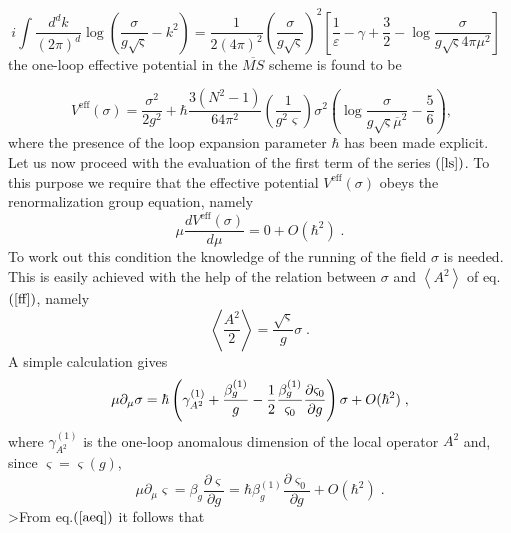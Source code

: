 \documentclass[a4paper,12pt]{article}
\begin{document}
\begin{equation}
i\int \frac{d^{d}k}{\left( 2\pi \right) ^{d}}\log \left( \frac{\sigma }{g%
\sqrt{\varsigma }}-k^{2}\right) =\frac{1}{2\left( 4\pi \right) ^{2}}\left( 
\frac{\sigma }{g\sqrt{\varsigma }}\right) ^{2}\left[ \frac{1}{\varepsilon }%
-\gamma +\frac{3}{2}-\log \frac{\sigma }{g\sqrt{\varsigma }4\pi \mu ^{2}}%
\right] \;\;  \label{dr}
\end{equation}
the one-loop effective potential in the $\overline{MS}$ scheme is found to be

\begin{equation}
\;V^{\mathrm{eff}}(\sigma )=\frac{\sigma ^{2}}{2g^{2}}+\hbar \frac{3\left(
N^{2}-1\right) }{64\pi ^{2}}\left( \frac{1}{g^{2}\varsigma }\right) \sigma
^{2}\left( \log \frac{\sigma }{g\sqrt{\varsigma }\overline{\mu }^{2}}-\frac{5%
}{6}\right) ,  \label{pf}
\end{equation}
where the presence of the loop expansion parameter $\hbar $ has been made
explicit. Let us now proceed with the evaluation of the first term of the
series $\left( \ref{ls}\right) $. To this purpose we require that the
effective potential $V^{\mathrm{eff}}(\sigma )$ obeys the renormalization
group equation, namely 
\begin{equation}
\mu \frac{dV^{\mathrm{eff}}(\sigma )}{d\mu }=0+O(\hbar ^{2})\;.  \label{aeq}
\end{equation}
To work out this condition the knowledge of the running of the field $\sigma 
$ is needed. This is easily achieved with the help of the relation between $%
\sigma $ and $\left\langle A^{2}\right\rangle $ of eq.$\left( \ref{ff}%
\right) $, namely 
\begin{equation}
\left\langle \frac{A^{2}}{2}\right\rangle =\frac{\sqrt{\varsigma }}{g}\sigma
\;.  \label{ffr}
\end{equation}
A simple calculation gives 
\begin{equation}
\mu \partial _{\mu }\sigma =\hbar \left( \gamma _{A^{2}}^{(1)}+\frac{\beta
_{g}^{(1)}}{g}-\frac{1}{2}\frac{\beta _{g}^{(1)}}{\varsigma _{0}}\frac{%
\partial \varsigma _{0}}{\partial g}\right) \sigma +O(\hbar ^{2})\;,
\label{mds}
\end{equation}
where $\gamma _{A^{2}}^{(1)}$ is the one-loop anomalous dimension of the
local operator $A^{2}$ and, since $\varsigma =\varsigma (g)$, 
\begin{equation}
\mu \partial _{\mu }\varsigma =\beta _{g}\frac{\partial \varsigma }{\partial
g}=\hbar \beta _{g}^{(1)}\frac{\partial \varsigma _{0}}{\partial g}+O(\hbar
^{2})\;.  \label{mdxi}
\end{equation}
>From eq.$\left( \ref{aeq}\right) $ it follows that
\end{document}
